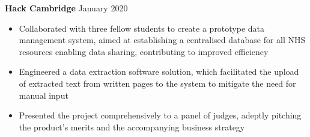 \documentclass{article}
\begin{document}


\textbf{Hack Cambridge} \hfill January 2020
\begin{itemize}
    \item Collaborated with three fellow students to create a prototype data management system, aimed at establishing a centralised database for all NHS resources enabling data sharing, contributing to improved efficiency
    \item Engineered a data extraction software solution, which facilitated the upload of extracted text from written pages to the system to mitigate the need for manual input
    \item Presented the project comprehensively to a panel of judges, adeptly pitching the product's merits and the accompanying business strategy
\end{itemize} \medskip
\end{document}
